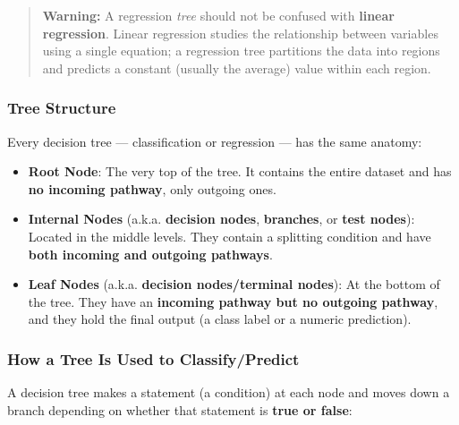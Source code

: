 \documentclass[12pt,openany]{book}
\begin{document}
\begin{quote}
\textbf{Warning:} A regression \textit{tree} should not be confused with \textbf{linear regression}. Linear regression studies the relationship between variables using a single equation; a regression tree partitions the data into regions and predicts a constant (usually the average) value within each region.
\end{quote}


\subsubsection{Tree Structure}

Every decision tree --- classification or regression --- has the same anatomy:

\begin{itemize}[leftmargin=*]
    \item \textbf{Root Node}: The very top of the tree. It contains the entire dataset and has \textbf{no incoming pathway}, only outgoing ones.
    \item \textbf{Internal Nodes} (a.k.a. \textbf{decision nodes}, \textbf{branches}, or \textbf{test nodes}): Located in the middle levels. They contain a splitting condition and have \textbf{both incoming and outgoing pathways}.
    \item \textbf{Leaf Nodes} (a.k.a. \textbf{decision nodes/terminal nodes}): At the bottom of the tree. They have an \textbf{incoming pathway but no outgoing pathway}, and they hold the final output (a class label or a numeric prediction).
\end{itemize}


\subsubsection{How a Tree Is Used to Classify/Predict}

A decision tree makes a statement (a condition) at each node and moves down a branch depending on whether that statement is \textbf{true or false}:
\end{document}
